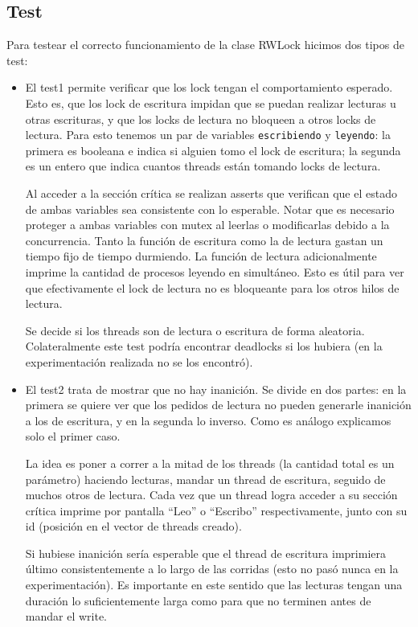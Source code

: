 \documentclass[hidelinks,a4paper,12pt, nofootinbib]{article}
\begin{document}
\subsection{Test}
Para testear el correcto funcionamiento de la clase RWLock hicimos dos tipos de test:

\begin{itemize}
  \item El test1 permite verificar que los lock tengan el comportamiento esperado. Esto es, que los lock de escritura impidan que se puedan realizar lecturas u otras escrituras, y que los locks de lectura no bloqueen a otros locks de lectura.
  Para esto tenemos un par de variables \texttt{escribiendo} y \texttt{leyendo}: la primera es booleana e indica si alguien tomo el lock de escritura; la segunda  es un entero que indica cuantos threads están tomando locks de lectura. 

  Al acceder a la sección crítica se realizan asserts que verifican que el estado de ambas variables sea consistente con lo esperable. Notar que es necesario proteger a ambas variables con mutex al leerlas o modificarlas debido a la concurrencia. Tanto la función de escritura como la de lectura gastan un tiempo fijo de tiempo durmiendo. La función de lectura adicionalmente imprime la cantidad de procesos leyendo en simultáneo. Esto es útil para ver que efectivamente el lock de lectura no es bloqueante para los otros hilos de lectura. 

  Se decide si los threads son de lectura o escritura de forma aleatoria. Colateralmente este test podría encontrar deadlocks si los hubiera (en la experimentación realizada no se los encontró).
  \item El test2 trata de mostrar que no hay inanición. Se divide en dos partes: en la primera se quiere ver que los pedidos de lectura no pueden generarle inanición a los de escritura, y en la segunda lo inverso. Como es análogo explicamos solo el primer caso.

  La idea es poner a correr a la mitad de los threads (la cantidad total es un parámetro) haciendo lecturas, mandar un thread de escritura, seguido de muchos otros de lectura. Cada vez que un thread logra acceder a su sección crítica imprime por pantalla ``Leo'' o ``Escribo'' respectivamente, junto con su id (posición en el vector de threads creado). 

  Si hubiese inanición sería esperable que el thread de escritura imprimiera último consistentemente a lo largo de las corridas (esto no pasó nunca en la experimentación). Es importante en este sentido que las lecturas tengan una duración lo suficientemente larga como para que no terminen antes de mandar el write.
\end{itemize}
\end{document}
